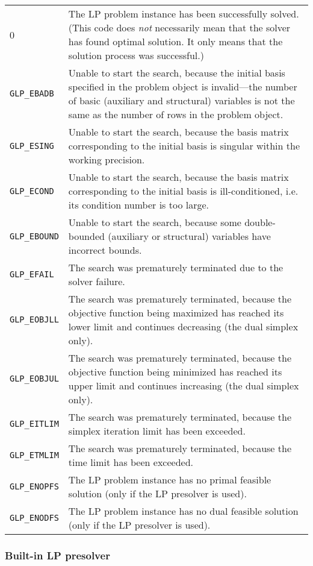 \begin{tabular}{@{}p{25mm}p{97.3mm}@{}}
0 & The LP problem instance has been successfully solved. (This code
does {\it not} necessarily mean that the solver has found optimal
solution. It only means that the solution process was successful.) \\
\verb|GLP_EBADB| & Unable to start the search, because the initial basis
specified in the problem object is invalid---the number of basic
(auxiliary and structural) variables is not the same as the number of
rows in the problem object.\\
\verb|GLP_ESING| & Unable to start the search, because the basis matrix
corresponding to the initial basis is singular within the working
precision.\\
\verb|GLP_ECOND| & Unable to start the search, because the basis matrix
corresponding to the initial basis is ill-conditioned, i.e. its
condition number is too large.\\
\verb|GLP_EBOUND| & Unable to start the search, because some
double-bounded (auxiliary or structural) variables have incorrect
bounds.\\
\verb|GLP_EFAIL| & The search was prematurely terminated due to the
solver failure.\\
\verb|GLP_EOBJLL| & The search was prematurely terminated, because the
objective function being maximized has reached its lower limit and
continues decreasing (the dual simplex only).\\
\verb|GLP_EOBJUL| & The search was prematurely terminated, because the
objective function being minimized has reached its upper limit and
continues increasing (the dual simplex only).\\
\verb|GLP_EITLIM| & The search was prematurely terminated, because the
simplex iteration limit has been exceeded.\\
\verb|GLP_ETMLIM| & The search was prematurely terminated, because the
time limit has been exceeded.\\
\verb|GLP_ENOPFS| & The LP problem instance has no primal feasible
solution (only if the LP presolver is used).\\
\verb|GLP_ENODFS| & The LP problem instance has no dual feasible
solution (only if the LP presolver is used).\\
\end{tabular}

\subsubsection*{Built-in LP presolver}

